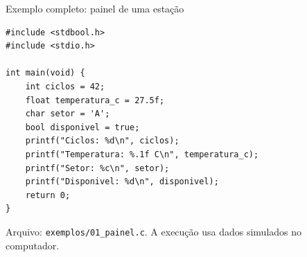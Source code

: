 \begin{frame}[fragile]{Exemplo completo: painel de uma estação}
\begin{lstlisting}
#include <stdbool.h>
#include <stdio.h>

int main(void) {
    int ciclos = 42;
    float temperatura_c = 27.5f;
    char setor = 'A';
    bool disponivel = true;
    printf("Ciclos: %d\n", ciclos);
    printf("Temperatura: %.1f C\n", temperatura_c);
    printf("Setor: %c\n", setor);
    printf("Disponivel: %d\n", disponivel);
    return 0;
}
\end{lstlisting}
\small Arquivo: \texttt{exemplos/01\_painel.c}. A execução usa dados simulados no computador.
\end{frame}
